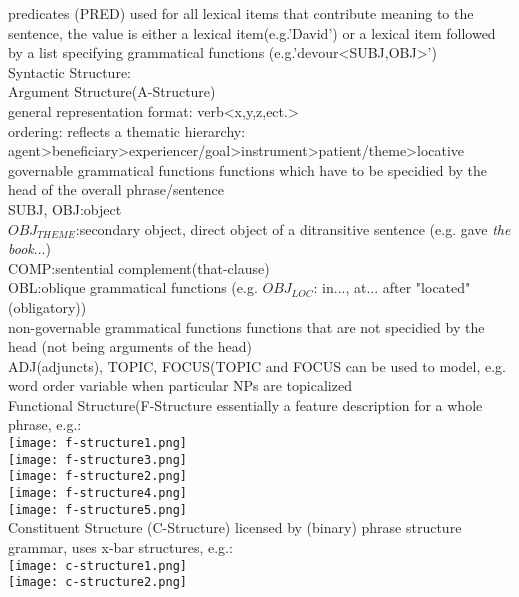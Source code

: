\scriptsize{predicates (PRED)} 
{\tiny used for all lexical items that contribute meaning to the sentence, the value is either a lexical item(e.g.'David') or a lexical item followed by a list specifying grammatical functions (e.g.'devour<SUBJ,OBJ>')
}\\
{\scriptsize Syntactic Structure:\\
Argument Structure(A-Structure)
}\\
{\tiny general representation format: verb<x,y,z,ect.>\\
ordering: reflects a thematic hierarchy: agent>beneficiary>experiencer/goal>instrument>patient/theme>locative
}\\
\scriptsize{governable grammatical functions} 
{\tiny functions which have to be specidied by the head of the overall phrase/sentence\\
SUBJ, OBJ:object\\ $OBJ_{THEME}$:secondary object, direct object of a ditransitive sentence (e.g. gave \textit{the book}...)\\ COMP:sentential complement(that-clause)\\ OBL:oblique grammatical functions (e.g. $OBJ_{LOC}$: in..., at... after "located" (obligatory))
}\\
\scriptsize{non-governable grammatical functions} 
{\tiny functions that are not specidied by the head (not being arguments of the head)\\
ADJ(adjuncts), TOPIC, FOCUS(TOPIC and FOCUS can be used to model, e.g. word order variable when particular NPs are topicalized
}\\
\scriptsize{Functional Structure(F-Structure} 
{\tiny essentially a feature description for a whole phrase, e.g.:}\\
\texttt{[image: f-structure1.png]}\\
\texttt{[image: f-structure3.png]}\\
\texttt{[image: f-structure2.png]}\\
\texttt{[image: f-structure4.png]}\\
\texttt{[image: f-structure5.png]}\\
\scriptsize{Constituent Structure (C-Structure)} 
{\tiny licensed by (binary) phrase structure grammar, uses x-bar structures, e.g.:}\\
\texttt{[image: c-structure1.png]}\\
\texttt{[image: c-structure2.png]}\\
